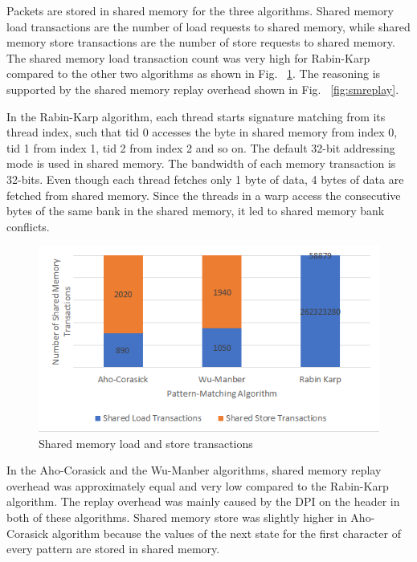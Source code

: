 Packets are stored in shared memory for the three algorithms. Shared memory load transactions are the number of load requests to shared memory, while shared memory store transactions are the number of store requests to shared memory. The shared memory load transaction count was very high for Rabin-Karp compared to the other two algorithms as shown in Fig. ~\ref{fig:smload}. The reasoning is supported by the shared memory replay overhead shown in Fig. ~\ref{fig:smreplay}.

In the Rabin-Karp algorithm, each thread starts signature matching from its thread index, such that tid 0 accesses the byte in shared memory from index 0, tid 1 from index 1, tid 2 from index 2 and so on. The default 32-bit addressing mode is used in shared memory. The bandwidth of each memory transaction is 32-bits. Even though each thread fetches only 1 byte of data, 4 bytes of data are fetched from shared memory. Since the threads in a warp access the consecutive bytes of the same bank in the shared memory, it led to shared memory bank conflicts.

\begin{figure}[H]
	\centering
	\includegraphics[width=12cm]{smtransactions.png}
	\caption{Shared memory load and store transactions}
	\label{fig:smload}    
\end{figure}
\squeezeup

In the Aho-Corasick and the Wu-Manber algorithms, shared memory replay overhead was approximately equal and very low compared to the Rabin-Karp algorithm. The replay overhead was mainly caused by the DPI on the header in both of these algorithms. Shared memory store was slightly higher in Aho-Corasick algorithm because the values of the next state for the first character of every pattern are stored in shared memory. 

